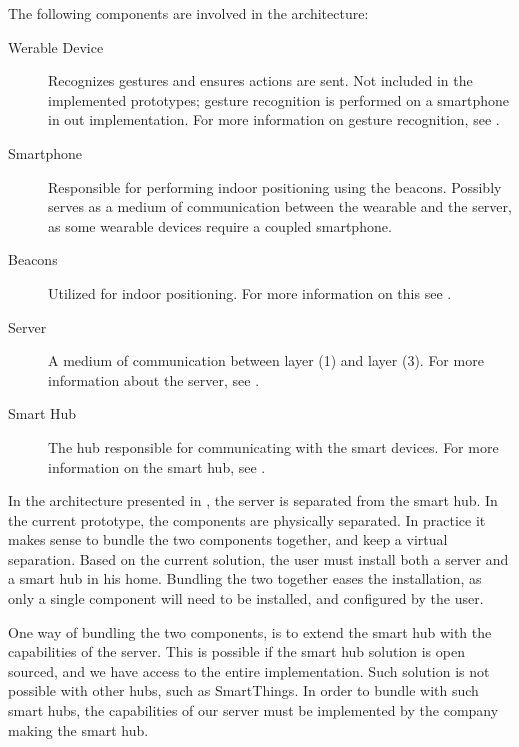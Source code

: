 The following components are involved in the architecture:
\begin{description}
    \item[Werable Device] Recognizes gestures and ensures actions are sent. Not included in the implemented prototypes; gesture recognition is performed on a smartphone in out implementation. For more information on gesture recognition, see .
    \item[Smartphone] Responsible for performing indoor positioning using the beacons. Possibly serves as a medium of communication between the wearable and the server, as some wearable devices require a coupled smartphone.
    \item[Beacons] Utilized for indoor positioning. For more information on this see .
    \item[Server] A medium of communication between layer (1) and layer (3). For more information about the server, see .
    \item[Smart Hub] The hub responsible for communicating with the smart devices. For more information on the smart hub, see .
\end{description}

In the architecture presented in , 
the server is separated from the smart hub. 
In the current prototype, 
the components are physically separated. 
In practice it makes sense to bundle the two components together, 
and keep a virtual separation. 
Based on the current solution, 
the user must install both a server and a smart hub in his home. 
Bundling the two together eases the installation, 
as only a single component will need to be installed, 
and configured by the user.

One way of bundling the two components, 
is to extend the smart hub with the capabilities of the server. 
This is possible if the smart hub solution is open sourced, 
and we have access to the entire implementation. 
Such solution is not possible with other hubs, such as SmartThings.
In order to bundle with such smart hubs, 
the capabilities of our server must be implemented by the company making the smart hub. 


